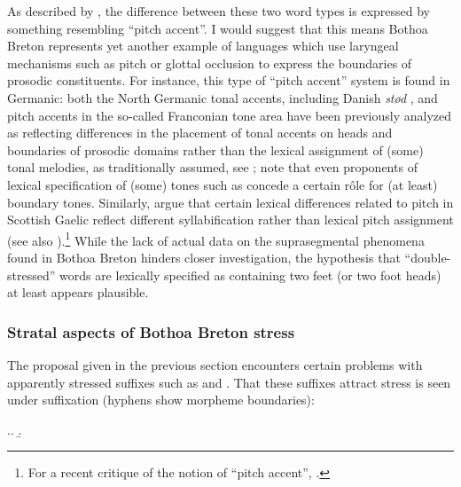As described by \citet{humphreys95:_phonol_bothoa_saint_nicol_pelem}, the difference between these two word types is expressed by something resembling \enquote{pitch accent}. I would suggest that this means Bothoa Breton represents yet another example of languages which use laryngeal mechanisms such as pitch or glottal occlusion to express the boundaries of prosodic constituents. For instance, this type of \enquote{pitch accent} system is found in Germanic: both the North Germanic tonal accents, including Danish \emph{stød} \citep{moren:_danis_stød_easter_norweg_pitch_accen,moren08:_using_north_german}, and pitch accents in the so-called Franconian tone area \citep{kohnlein11:_rule} have been previously analyzed as reflecting differences in the placement of tonal accents on heads and boundaries of prosodic domains rather than the lexical assignment of (some) tonal melodies, as traditionally assumed, see \eg \citet{lorentz84:_stres,riad92:_struc_german,gussenhoven99:_word,kristoffersen00:_norweg}; note that even proponents of lexical specification of (some) tones such as \citet{wetterlin10:_tonal_norweg} concede a certain rôle for (at least) boundary tones. Similarly, \citet{ladefogedetal-scg} argue that certain lexical differences related to pitch in Scottish Gaelic reflect different syllabification rather than lexical pitch assignment (see also \citealt{hind-epenthesis,bosch-dejong,hall-intrusion,ternes06:_scott_gaelic_applec_ross}).\footnote{For a recent critique of the notion of \enquote{pitch accent}, \cf \citet{hyman09:_how}.} While the lack of actual data on the suprasegmental phenomena found in Bothoa Breton hinders closer investigation, the hypothesis that \enquote{double-stressed} words are lexically specified as containing two feet (or two foot heads) at least appears plausible.

\subsubsection{Stratal aspects of Bothoa Breton stress}
\label{sec:strat-aspects-both}

The proposal given in the previous section encounters certain problems with apparently stressed suffixes such as  and . That these suffixes attract stress is seen under suffixation (hyphens show morpheme boundaries):

\ex.\a.
\b.

